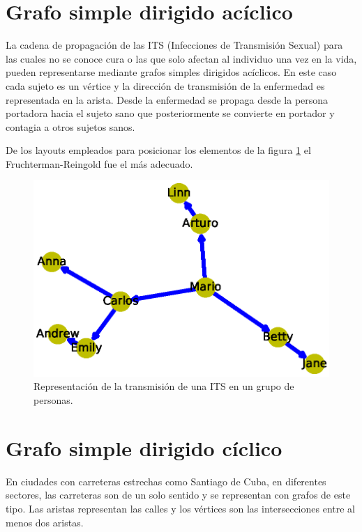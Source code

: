 \documentclass{article}
\begin{document}


\section{Grafo simple dirigido acíclico}

La cadena de propagación de las ITS (Infecciones de Transmisión Sexual) para las cuales no se conoce cura o las que solo afectan al individuo una vez en la vida, pueden representarse mediante grafos simples dirigidos acíclicos. En este caso cada sujeto es un vértice y la dirección de transmisión de la enfermedad es representada en la arista. Desde la enfermedad se propaga desde la persona portadora hacia el sujeto sano que posteriormente se convierte en portador y contagia a otros sujetos sanos.

De los layouts empleados para posicionar los elementos de la figura \ref{Figura 4} el Fruchterman-Reingold fue el más adecuado.

\begin{figure}
  \includegraphics[width=.8\columnwidth]{fig4.eps}
  \caption{Representación de la transmisión de una ITS en un grupo de personas.}
  \label{Figura 4}
\end{figure}
\newpage


\section{Grafo simple dirigido cíclico}

En ciudades con carreteras estrechas como Santiago de Cuba, en diferentes sectores, las carreteras son de un solo sentido y se representan con grafos de este tipo. Las aristas representan las calles y los vértices son las intersecciones entre al menos dos aristas.
\end{document}
